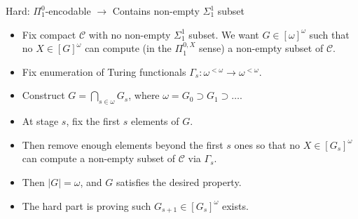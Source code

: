 \documentclass[notes]{beamer}
\begin{document}
\begin{frame}{Hard: $\Pi_1^0$-encodable $\rightarrow$ Contains
non-empty $\Sigma_1^1$ subset}
  \begin{itemize}
    \item Fix compact $\mathcal{C}$ with no non-empty $\Sigma_1^1$ subset.
      We want $G\in[\omega]^\omega$ such that no $X\in[G]^\omega$
      can compute (in the $\Pi_1^{0,X}$ sense) a non-empty subset of
      $\mathcal{C}$.

    \item Fix enumeration of Turing functionals $\Gamma_s:\omega^{<\omega}
      \rightarrow \omega^{<\omega}$.

    \item Construct $G=\bigcap_{s\in\omega}G_s$, where
      $\omega=G_0\supset G_1\supset\ldots$.
      
    \item At stage $s$, fix the first $s$ elements of $G$.
    
    \item Then remove enough elements beyond the first $s$ ones so that no
      $X\in[G_s]^\omega$ can compute a non-empty subset of $\mathcal{C}$
      via $\Gamma_s$.

    \item Then $|G|=\omega$, and $G$ satisfies the desired property.

    \item The hard part is proving such $G_{s+1}\in[G_s]^\omega$ exists.
  \end{itemize}
\end{frame}
\end{document}
